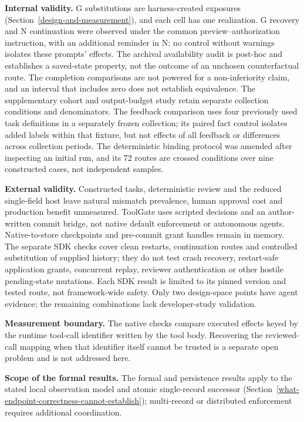 \documentclass[pdflatex,sn-basic]{sn-jnl}
\begin{document}
\textbf{Internal validity.} G substitutions are harness-created exposures (Section~\ref{design-and-measurement}), and each cell has one realization. G recovery and N continuation were observed under the common preview--authorization instruction, with an additional reminder in N; no control without warnings isolates these prompts' effects. The archival availability audit is post-hoc and establishes a saved-state property, not the outcome of an unchosen counterfactual route. The completion comparisons are not powered for a non-inferiority claim, and an interval that includes zero does not establish equivalence. The supplementary cohort and output-budget study retain separate collection conditions and denominators. The feedback comparison uses four previously used task definitions in a separately frozen collection; its paired fact control isolates added labels within that fixture, but not effects of all feedback or differences across collection periods. The deterministic binding protocol was amended after inspecting an initial run, and its 72 routes are crossed conditions over nine constructed cases, not independent samples.

\textbf{External validity.} Constructed tasks, deterministic review and the reduced single-field host leave natural mismatch prevalence, human approval cost and production benefit unmeasured. ToolGate uses scripted decisions and an author-written commit bridge, not native default enforcement or autonomous agents. Native-to-store checkpoints and pre-commit grant handles remain in memory. The separate SDK checks cover clean restarts, continuation routes and controlled substitution of supplied history; they do not test crash recovery, restart-safe application grants, concurrent replay, reviewer authentication or other hostile pending-state mutations. Each SDK result is limited to its pinned version and tested route, not framework-wide safety. Only two design-space points have agent evidence; the remaining combinations lack developer-study validation.

\textbf{Measurement boundary.} The native checks compare executed effects keyed by the runtime tool-call identifier written by the tool body. Recovering the reviewed-call mapping when that identifier itself cannot be trusted is a separate open problem and is not addressed here.

\textbf{Scope of the formal results.} The formal and persistence results apply to the stated local observation model and atomic single-record successor (Section~\ref{what-endpoint-correctness-cannot-establish}); multi-record or distributed enforcement requires additional coordination.
\end{document}
